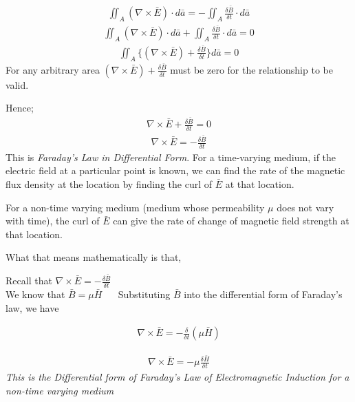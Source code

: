 \begin{align*}
\iint_A(\nabla\times\bar{E})\cdot d\bar{a} = -\iint_A\frac{\delta \bar{B}}{\delta t}\cdot d\bar{a}
\end{align*}
\begin{align*}
\iint_A(\nabla\times\bar{E})\cdot d\bar{a} + \iint_A\frac{\delta \bar{B}}{\delta t}\cdot d\bar{a} = 0
\end{align*}
\begin{align*}
\iint_A\{(\nabla \times \bar{E})+ \frac{\delta \bar{B}}{\delta t}\} d\bar{a} = 0
\end{align*} 
For any arbitrary area $(\nabla \times \bar{E})+ \frac{\delta \bar{B}}{\delta t}$ must be zero for the relationship to be valid.

Hence;
\begin{align*}
\nabla \times \bar{E}+ \frac{\delta \bar{B}}{\delta t} = 0
\end{align*}
\begin{align}
\nabla \times \bar{E} = -\frac{\delta \bar{B}}{\delta t}
\end{align}
This is \emph{Faraday's Law in Differential Form}. For a time-varying medium, if the electric field at a particular point is known, we can find the rate of the magnetic flux density at the location by finding the curl of $\bar{E}$ at that location.

For a non-time varying medium (medium whose permeability $\mu$ does not vary with time), the curl of $\bar{E}$ can give the rate of change of magnetic field strength at that location.

What that means mathematically is that,

Recall that $\nabla \times \bar{E} = - \frac{\delta\bar{B}}{\delta t}$\\
We know that $\bar{B} = \mu \bar{H}$ $\quad$ Substituting $\bar{B}$ into the differential form of Faraday's law, we have	

\begin{align*}
\nabla \times \bar{E} = - \frac{\delta}{\delta t} (\mu\bar{H})
\end{align*}

\begin{align}
\nabla \times \bar{E} = -\mu\frac{\delta \bar{H}}{\delta t}
\end{align}
\emph{This is the Differential form of Faraday's Law of Electromagnetic Induction for a non-time varying medium}

